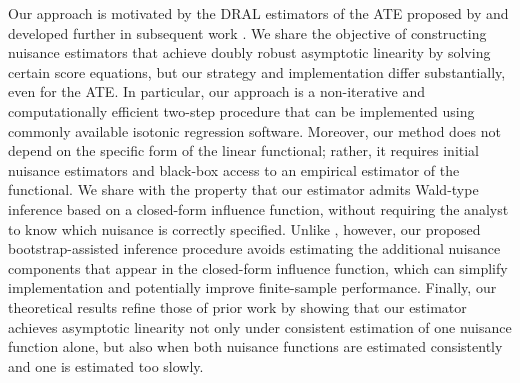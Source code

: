 \documentclass[11pt]{article}
\theoremstyle{plain}
\begin{document}


 Our approach is motivated by the DRAL estimators of the ATE proposed by \citet{van2014targeted} and developed further in subsequent work \citep{benkeser2017doubly, diaz2017doubly, diaz2019statistical, dukes2024doubly}. We share the objective of constructing nuisance estimators that achieve doubly robust asymptotic linearity by solving certain score equations, but our strategy and implementation differ substantially, even for the ATE. In particular, our approach is a non-iterative and computationally efficient two-step procedure that can be implemented using commonly available isotonic regression software. Moreover, our method does not depend on the specific form of the linear functional; rather, it requires initial nuisance estimators and black-box access to an empirical estimator of the functional. { \color{purple} We share with \cite{benkeser2017doubly} the property that our estimator admits Wald-type inference based on a closed-form influence function, without requiring the analyst to know which nuisance is correctly specified. Unlike \cite{benkeser2017doubly}, however, our proposed bootstrap-assisted inference procedure avoids estimating the additional nuisance components that appear in the closed-form influence function, which can simplify implementation and potentially improve finite-sample performance. } Finally, our theoretical results refine those of prior work by showing that our estimator achieves asymptotic linearity not only under consistent estimation of one nuisance function alone, but also when both nuisance functions are estimated consistently and one is estimated too slowly.
\end{document}
